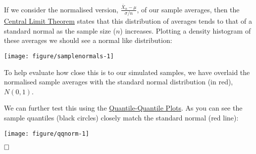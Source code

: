 \documentclass[legalpaper]{article}
\begin{document}
If we consider the normalised version,
\(\frac {\bar X_n - \mu} {\sigma / n}\), of our sample averages, then
the \href{https://en.wikipedia.org/wiki/Central_limit_theorem}{Central
Limit Theorem} states that this distribution of averages tends to that
of a standard normal as the sample size (\(n\)) increases. Plotting a
density histogram of these averages we should see a normal like
distribution:

\begin{center}\texttt{[image: figure/samplenormals-1]} \end{center}

To help evaluate how close this is to our simulated samples, we have
overlaid the normalised sample averages with the standard normal
distribution (in red), \(N(0,1)\).

We can further test this using the
\href{https://stat.ethz.ch/R-manual/R-devel/library/stats/html/qqnorm.html}{Quantile-Quantile
Plots}. As you can see the sample quantiles (black circles) closely
match the standard normal (red line):

\begin{center}\texttt{[image: figure/qqnorm-1]} \end{center}

\(\hfill \square\)
\end{document}
